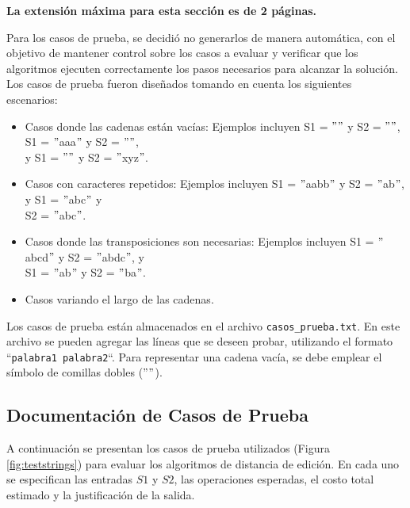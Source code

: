 \begin{mdframed}
    \textbf{La extensión máxima para esta sección es de 2 páginas.}
\end{mdframed}

Para los casos de prueba, se decidió no generarlos de manera automática, con el objetivo de mantener control sobre los casos a evaluar y verificar que los algoritmos ejecuten correctamente los pasos necesarios para alcanzar la solución. Los casos de prueba fueron diseñados tomando en cuenta los siguientes escenarios:

\begin{itemize} 
    \item Casos donde las cadenas están vacías: Ejemplos incluyen S1 = $""$ y S2 = $""$, S1 = $"$aaa$"$ y S2 = $""$, \\ 
    y S1 = $""$ y S2 = $"$xyz$"$. 
    \item Casos con caracteres repetidos: Ejemplos incluyen S1 = $"$aabb$"$ y S2 = $"$ab$"$, y S1 = $"$abc$"$ y \\
    S2 = $"$abc$"$. 
    \item Casos donde las transposiciones son necesarias: Ejemplos incluyen S1 = $"$abcd$"$ y S2 = $"$abdc$"$, y \\
    S1 = $"$ab$"$ y S2 = $"$ba$"$. 
    \item Casos variando el largo de las cadenas.
\end{itemize}

Los casos de prueba están almacenados en el archivo \texttt{casos\_prueba.txt}. En este archivo se pueden agregar las líneas que se deseen probar, utilizando el formato ``\texttt{palabra1 palabra2}``. Para representar una cadena vacía, se debe emplear el símbolo de comillas dobles ($""$).

\subsection{Documentación de Casos de Prueba}

A continuación se presentan los casos de prueba utilizados (Figura \ref{fig:teststrings}) para evaluar los algoritmos de distancia de edición. En cada uno se especifican las entradas \( S1 \) y \( S2 \), las operaciones esperadas, el costo total estimado y la justificación de la salida.


